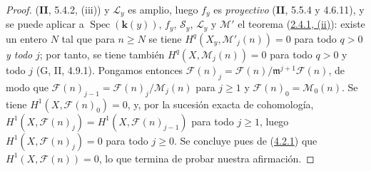 \documentclass[10pt,oneside,openany]{book}
\theoremstyle{egaenv}\newtheorem*{env}{---}
\theoremstyle{egastatement}
\theoremstyle{egadescription}
\renewcommand{\geq}{\geqslant}
\begin{document}
\begin{proof}
(\textbf{II}, 5.4.2, (iii)) y $\mathcal L_y$ es amplio, luego $f_y$ es \emph{proyectivo}
(\textbf{II}, 5.5.4 y 4.6.11), y se puede aplicar a
$\operatorname{Spec}(\boldsymbol{k}(y))$, $f_y$, $\mathcal S_y$, $\mathcal L_y$ y
$\mathcal M'$ el teorema (\hyperref[III.2.4.1-fr]{2.4.1, (ii)}):
existe un entero $N$ tal que para $n\geq N$ se tiene
$H^q(X_y,\mathcal M'_j(n))=0$ para todo $q>0$ \emph{y todo} $j$; por tanto, se tiene
también $H^q(X,\mathcal M_j(n))=0$ para todo $q>0$ y todo $j$
(G, II, 4.9.1). Pongamos entonces
$\mathcal F(n)_j=\mathcal F(n)/\mathfrak m^{j+1}\mathcal F(n)$,
de modo que $\mathcal F(n)_{j-1}=\mathcal F(n)_j/\mathcal M_j(n)$ para
$j\geq1$ y $\mathcal F(n)_0=\mathcal M_0(n)$. Se tiene
$H^1(X,\mathcal F(n)_0)=0$, y, por la sucesión exacta de cohomología,
$H^1(X,\mathcal F(n)_j)=H^1(X,\mathcal F(n)_{j-1})$ para todo $j\geq1$,
luego $H^1(X,\mathcal F(n)_j)=0$ para todo $j\geq0$. Se concluye pues de
(\hyperref[III.4.2.1-fr]{4.2.1}) que $H^1(X,\mathcal F(n))=0$, lo que
termina de probar nuestra afirmación.


\end{proof}
\end{document}
